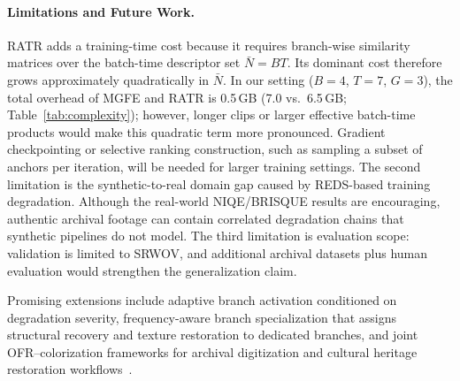 \paragraph{Limitations and Future Work.}
RATR adds a training-time cost because it requires branch-wise similarity matrices over the batch-time descriptor set $\bar{N}=BT$. Its dominant cost therefore grows approximately quadratically in $\bar{N}$. In our setting ($B{=}4$, $T{=}7$, $G{=}3$), the total overhead of MGFE and RATR is 0.5\,GB (7.0 vs.\ 6.5\,GB; Table~\ref{tab:complexity}); however, longer clips or larger effective batch-time products would make this quadratic term more pronounced. Gradient checkpointing or selective ranking construction, such as sampling a subset of anchors per iteration, will be needed for larger training settings. The second limitation is the synthetic-to-real domain gap caused by REDS-based training degradation. Although the real-world NIQE/BRISQUE results are encouraging, authentic archival footage can contain correlated degradation chains that synthetic pipelines do not model. The third limitation is evaluation scope: validation is limited to SRWOV, and additional archival datasets plus human evaluation would strengthen the generalization claim.

Promising extensions include adaptive branch activation conditioned on degradation severity, frequency-aware branch specialization that assigns structural recovery and texture restoration to dedicated branches, and joint OFR--colorization frameworks for archival digitization and cultural heritage restoration workflows~\cite{kokaram2004missing}.
